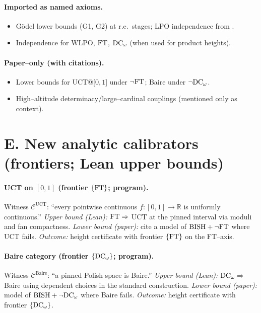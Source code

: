 \documentclass[11pt]{article}
\theoremstyle{definition}
\theoremstyle{remark}
\newcommand{\WLPO}{\mathrm{WLPO}}
\newcommand{\BISH}{\mathrm{BISH}}
\begin{document}
\paragraph{Imported as named axioms.}
\begin{itemize}
\item G\"odel lower bounds (G1, G2) at r.e.\ stages; LPO independence from \HA.
\item Independence for $\WLPO$, $\mathrm{FT}$, $\mathrm{DC}_\omega$ (when used for product heights).
\end{itemize}

\paragraph{Paper–only (with citations).}
\begin{itemize}
\item Lower bounds for UCT@[$0,1$] under $\neg\mathrm{FT}$; Baire under $\neg\mathrm{DC}_\omega$.
\item High–altitude determinacy/large–cardinal couplings (mentioned only as context).
\end{itemize}

\section{E. New analytic calibrators (frontiers; Lean upper bounds)}

\paragraph{UCT on $[0,1]$ (frontier $\{\mathrm{FT}\}$; program).}
Witness $\mathcal C^{\mathrm{UCT}}$: ``every pointwise continuous $f:[0,1]\to\mathbb R$ is uniformly continuous.''  
\emph{Upper bound (Lean):} $\mathrm{FT}\Rightarrow$ UCT at the pinned interval via moduli and fan compactness.  
\emph{Lower bound (paper):} cite a model of $\BISH+\neg\FT$ where UCT fails.  
\emph{Outcome:} height certificate with frontier $\{\mathrm{FT}\}$ on the FT–axis.

\paragraph{Baire category (frontier $\{\mathrm{DC}_\omega\}$; program).}
Witness $\mathcal C^{\mathrm{Baire}}$: ``a pinned Polish space is Baire.''  
\emph{Upper bound (Lean):} $\mathrm{DC}_\omega\Rightarrow$ Baire using dependent choices in the standard construction.  
\emph{Lower bound (paper):} model of $\BISH+\neg\DCw$ where Baire fails.  
\emph{Outcome:} height certificate with frontier $\{\mathrm{DC}_\omega\}$.
\end{document}
